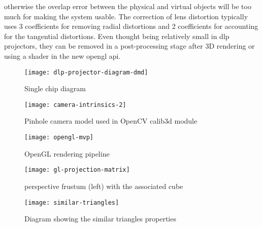 otherwise the overlap error between the physical and virtual objects will be too much for making the system usable. The correction of lens distortion typically uses 3 coefficients for removing radial distortions and 2 coefficients for accounting for the tangential distortions. Even thought being relatively small in \gls{dlp} projectors, they can be removed in a post-processing stage after 3D rendering or using a shader in the new \gls{opengl} \gls{api}.

\begin{figure}[!ht]
	\centering
	\texttt{[image: dlp-projector-diagram-dmd]}
	\caption[Single chip  diagram]{Single chip  diagram\protect\footnotemark}
	\label{fig:dlp-projector-diagram-dmd}
\end{figure}

\begin{figure}[!ht]
	\centering
	\texttt{[image: camera-intrinsics-2]}
	\caption[Pinhole camera model used in OpenCV calib3d module]{Pinhole camera model used in OpenCV calib3d module\protect\footnotemark}
	\label{fig:camera-intrinsics-2}
\end{figure}

\begin{figure}[!ht]
	\centering
	\texttt{[image: opengl-mvp]}
	\caption[OpenGL rendering pipeline]{OpenGL rendering pipeline\protect\footnotemark}
	\label{fig:opengl-mvp}
\end{figure}

\begin{figure}[!ht]
	\centering
	\texttt{[image: gl-projection-matrix]}
	\caption[{ perspective frustum (left) with the associated  cube}]{{ perspective frustum (left) with the associated  cube}\protect\footnotemark}
	\label{fig:gl-projection-matrix}
\end{figure}

\begin{figure}[!ht]
	\centering
	\texttt{[image: similar-triangles]}
	\caption[Diagram showing the similar triangles properties]{Diagram showing the similar triangles properties\protect\footnotemark}
	\label{fig:similar-triangles}
\end{figure}



